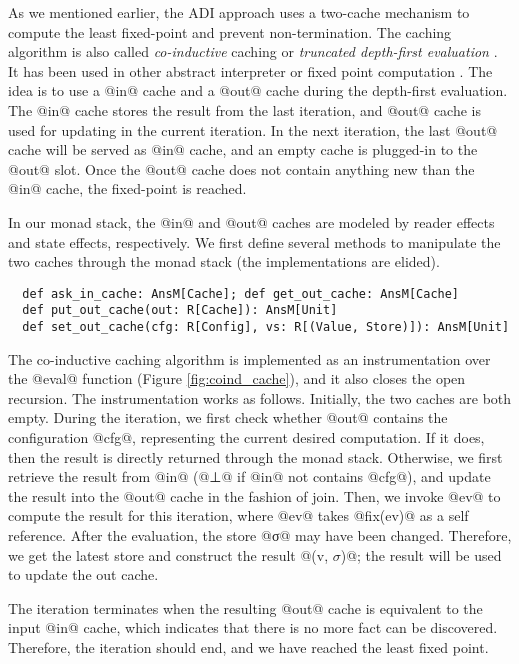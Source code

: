 As we mentioned earlier, the ADI approach uses a two-cache mechanism to
compute the least fixed-point and prevent non-termination.
The caching algorithm is also called \textit{co-inductive} caching or
\textit{truncated depth-first evaluation} \cite{Rosendahl:AbsIntPL}. It has
been used in other abstract interpreter or fixed point computation
\cite{DBLP:journals/pacmpl/DaraisLNH17, Wei:2018:RAA:3243631.3236800,
  Rosendahl:AbsIntPL}. The idea is to use a @in@ cache and a @out@ cache during
the depth-first evaluation. The @in@ cache stores the result from the last
iteration, and @out@ cache is used for updating in the current iteration. In the next
iteration, the last @out@ cache will be served as @in@ cache, and an empty cache
is plugged-in to the @out@ slot. Once the @out@ cache does not contain anything
new than the @in@ cache, the fixed-point is reached.

In our monad stack, the @in@ and @out@ caches are modeled by reader effects and
state effects, respectively. We first define several methods to manipulate
the two caches through the monad stack (the implementations are elided).
\begin{lstlisting}
  def ask_in_cache: AnsM[Cache]; def get_out_cache: AnsM[Cache]
  def put_out_cache(out: R[Cache]): AnsM[Unit]
  def set_out_cache(cfg: R[Config], vs: R[(Value, Store)]): AnsM[Unit]
\end{lstlisting}

The co-inductive caching algorithm is implemented as an instrumentation over the
@eval@ function (Figure \ref{fig:coind_cache}), and it also closes the open recursion.
The instrumentation works as follows. Initially, the two caches are both empty.
During the iteration, we first check whether @out@ contains the configuration
@cfg@, representing the current desired computation. If it does, then the result
is directly returned through the monad stack.
Otherwise, we first retrieve the result from @in@ (@⊥@ if @in@ not contains
@cfg@), and update the result into the @out@ cache in the fashion of join.
Then, we invoke @ev@ to compute the result for this iteration, where @ev@ takes
@fix(ev)@ as a self reference.
After the evaluation, the store @σ@ may have been changed. Therefore, 
we get the latest store and construct the result @(v, $\sigma$)@; the
result will be used to update the out cache.

The iteration terminates when the resulting @out@ cache is equivalent to the
input @in@ cache, which indicates that there is no more fact can be discovered.
Therefore, the iteration should end, and we have reached the least fixed point.

